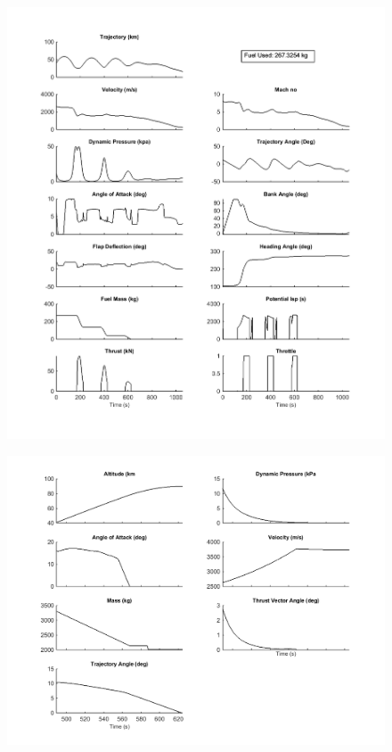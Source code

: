 \begin{figure}
\centering
\includegraphics[width=1\linewidth]{figures/6_FlyBack/mode1/ReturnStandard}
\caption{}
\label{fig:ReturnStandard}
\end{figure}

\begin{figure}
\centering
\includegraphics[width=1\linewidth]{figures/6_FlyBack/mode1/ThirdStageStandard}
\caption{}
\label{fig:ThirdStageStandard}
\end{figure}



